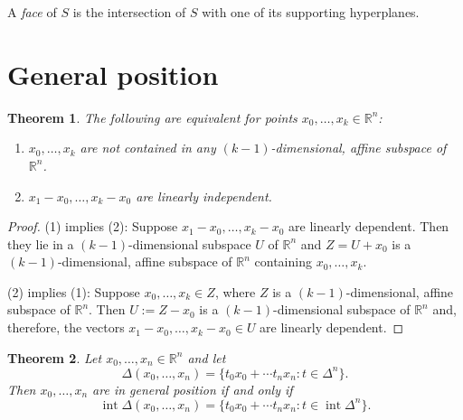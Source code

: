 \documentclass[12pt]{amsart}
\newtheorem{theorem}{Theorem}[section]
\theoremstyle{definition}
\theoremstyle{remark}
\numberwithin{equation}{section}
\newcommand{\RR}{\mathbb{R}}
\DeclareMathOperator{\interior}{int}
\begin{document}
A \emph{face} of $S$ is the intersection of $S$ with one of its supporting
hyperplanes.


\section{General position}

\begin{theorem}
    The following are equivalent for points $x_0,\ldots,x_k\in\RR^n$:
    \begin{enumerate}
        \item $x_0,\ldots,x_k$ are not contained in any
        $(k-1)$-dimensional, affine subspace of $\RR^n$.
        \item $x_1-x_0,\ldots,x_k-x_0$ are linearly independent.
    \end{enumerate}
\end{theorem}

\begin{proof}\hfill
    
    (1) implies (2):
    Suppose $x_1-x_0,\ldots,x_k-x_0$ are linearly dependent.
    Then they lie in a $(k-1)$-dimensional subspace $U$ of $\RR^n$ and
    $Z=U+x_0$ is a $(k-1)$-dimensional, affine subspace of $\RR^n$
    containing $x_0,\ldots,x_k$.

    (2) implies (1):
    Suppose $x_0,\ldots,x_k\in Z$, where $Z$ is a $(k-1)$-dimensional,
    affine subspace of $\RR^n$.
    Then $U:=Z-x_0$ is a $(k-1)$-dimensional subspace of $\RR^n$ and,
    therefore, the vectors $x_1-x_0,\ldots,x_k-x_0\in U$ are linearly
    dependent.
\end{proof}

\begin{theorem}
    Let $x_0,\ldots,x_n\in \RR^n$ and let
    \[
        \Delta(x_0,\ldots,x_n)=\{t_0x_0+\cdots t_nx_n : t\in\Delta^n\}.
    \]
    Then $x_0,\ldots,x_n$ are in general position if and only if
    \[
        \interior\Delta(x_0,\ldots,x_n) = \{t_0x_0+\cdots t_nx_n :
        t\in\interior\Delta^n\}.
    \]
\end{theorem}
\end{document}

